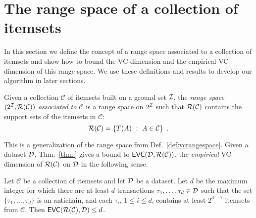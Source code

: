 \section{The range space of a collection of itemsets}\label{sec:range}
In this section we define the concept of a range space associated to a
collection of itemsets and show how to bound the VC-dimension and the
empirical VC-dimension of this range space. We use these definitions and results
to develop our algorithm in later sections.

\begin{definition}\label{def:rangeset}
Given a collection $\mathcal{C}$ of itemsets built on a ground set ${\cal I}$, the
\emph{range space $(2^{\cal I},\mathcal{R}(\mathcal{C}))$ associated to $\mathcal{C}$} is a range
space on $2^{\cal I}$ such that $\mathcal{R}(\mathcal{C})$ contains the support sets of
the itemsets in $\mathcal{C}$:
\[\mathcal{R}(\mathcal{C})=\{T(A) ~:~ A\in\mathcal{C}\}\enspace.\]
\end{definition}
This is a generalization of the range space from Def.~\ref{def:vcrangespace}.
Given a dataset ${\cal D}$, Thm.~\ref{thm:} gives a bound to
$\mathsf{EVC}({\cal D},\mathcal{R}(\mathcal{C}))$,  the \emph{empirical} VC-dimension of
$\mathcal{R}(\mathcal{C})$ on ${\cal D}$ in the following sense.


\begin{theorem}\label{lem:evcdimupbound}
  Let $\mathcal{C}$ be a collection of itemsets and let ${\cal D}$ be a dataset. Let
  $d$ be the maximum integer for which there are at least $d$
  transactions $\tau_1,\dotsc,\tau_d\in {\cal D}$ such that the set
  $\{\tau_1,\dotsc,\tau_d\}$ is an antichain, and each $\tau_i$, $1\le i\le d$,
  contains at least $2^{d-1}$ itemsets from $\mathcal{C}$. 
  Then $\mathsf{EVC}(\mathcal{R}(\mathcal{C}),{\cal D})\le d$.
\end{theorem}

